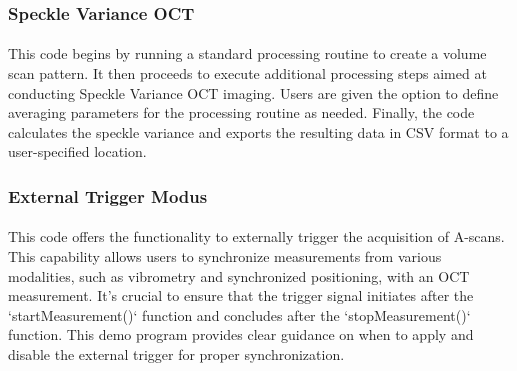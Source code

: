 \subsubsection{Speckle Variance OCT}
\paragraph{}
This code begins by running a standard processing routine to create a volume scan pattern. It then proceeds to execute additional processing steps aimed at conducting Speckle Variance OCT imaging. Users are given the option to define averaging parameters for the processing routine as needed. Finally, the code calculates the speckle variance and exports the resulting data in CSV format to a user-specified location.

\subsubsection{External Trigger Modus}
\paragraph{}
This code offers the functionality to externally trigger the acquisition of A-scans. This capability allows users to synchronize measurements from various modalities, such as vibrometry and synchronized positioning, with an OCT measurement. It's crucial to ensure that the trigger signal initiates after the `startMeasurement()` function and concludes after the `stopMeasurement()` function. This demo program provides clear guidance on when to apply and disable the external trigger for proper synchronization.


